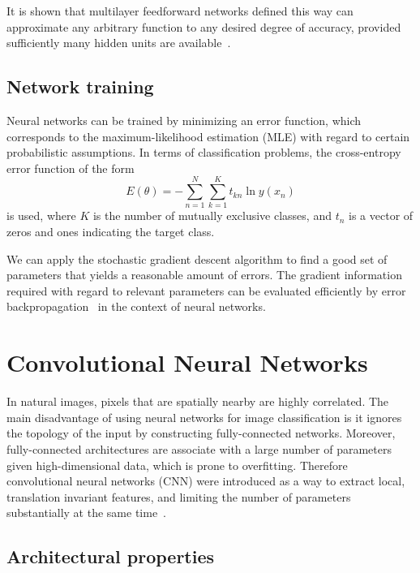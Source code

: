 It is shown that multilayer feedforward networks defined this way can approximate any arbitrary function to any desired degree of accuracy, provided sufficiently many hidden units are available~\cite{hornik1989multilayer}.

\subsection{Network training}
\label{sec:NN training}
Neural networks can be trained by minimizing an error function, which corresponds to the maximum-likelihood estimation (MLE) with regard to certain probabilistic assumptions. In terms of classification problems, the cross-entropy error function of the form
\begin{equation}
	E(\theta) = -\sum\limits_{n=1}^N\sum\limits_{k=1}^Kt_{kn}\ln y(x_n)
\end{equation}
is used, where $K$ is the number of mutually exclusive classes, and $t_n$ is a vector of zeros and ones indicating the target class.

We can apply the stochastic gradient descent algorithm to find a good set of parameters that yields a reasonable amount of errors. The gradient information required with regard to relevant parameters can be evaluated efficiently by error backpropagation~\cite{rumelhart1985learning} in the context of neural networks.

\section{Convolutional Neural Networks}
\label{sec:Convolutional Neural Networks}

In natural images, pixels that are spatially nearby are highly correlated. The main disadvantage of using neural networks for image classification is it ignores the topology of the input by constructing fully-connected networks. Moreover, fully-connected architectures are associate with a large number of parameters given high-dimensional data, which is prone to overfitting. Therefore convolutional neural networks (CNN) were introduced as a way to extract local, translation invariant features, and limiting the number of parameters substantially at the same time~\cite{lecun1995convolutional}.


\subsection{Architectural properties}
\label{sec:Architectural properties}

